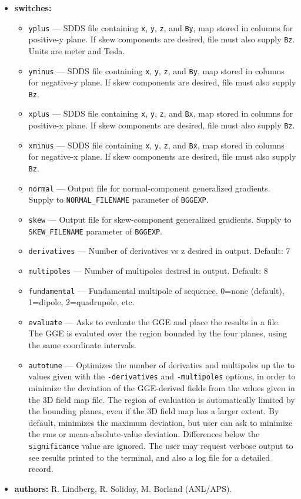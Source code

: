 \documentclass[11pt]{article}
\begin{document}
\begin{itemize}
\item {\bf switches:}
\begin{itemize}
\item {\tt yplus} --- SDDS file containing \verb|x|, \verb|y|, \verb|z|, and \verb|By|, 
  map stored in columns for positive-y plane. If skew components are desired, file must also supply \verb|Bz|.
  Units are meter and Tesla.
\item {\tt yminus} --- SDDS file containing \verb|x|, \verb|y|, \verb|z|, and \verb|By|, 
  map stored in columns for negative-y plane. If skew components are desired, file must also supply \verb|Bz|.
\item {\tt xplus} ---  SDDS file containing \verb|x|, \verb|y|, \verb|z|, and \verb|Bx|, 
  map stored in columns for positive-x plane. If skew components are desired, file must also supply \verb|Bz|.
\item {\tt xminus} ---  SDDS file containing \verb|x|, \verb|y|, \verb|z|, and \verb|Bx|, 
  map stored in columns for negative-x plane. If skew components are desired, file must also supply \verb|Bz|.
\item {\tt normal} ---  Output file for normal-component generalized gradients. Supply to \verb|NORMAL_FILENAME|
  parameter of \verb|BGGEXP|.
\item {\tt skew} ---  Output file for skew-component generalized gradients. Supply to \verb|SKEW_FILENAME|
  parameter of \verb|BGGEXP|.
\item {\tt derivatives} --- Number of derivatives vs z desired in output. Default: 7
\item {\tt multipoles} ---  Number of multipoles desired in output. Default: 8
\item {\tt fundamental} --- Fundamental multipole of sequence. 0=none (default), 1=dipole, 2=quadrupole, etc.
\item {\tt evaluate} --- Asks to evaluate the GGE and place the results in a file. The GGE is evaluted over
  the region bounded by the four planes, using the same coordinate intervals.
\item {\tt autotune} --- Optimizes the number of derivaties and multipoles up the to values given with the
  \verb|-derivatives| and \verb|-multipoles| options, in order to minimize the deviation of the GGE-derived
  fields from the values given in the 3D field map file. The region of evaluation is automatically limited by
  the bounding planes, even if the 3D field map has a larger extent. By default, minimizes the maximum deviation, but user can
  ask to minimize the rms or mean-absolute-value deviation. Differences below the \verb|significance| value are
  ignored. The user may request verbose output to see results printed to the terminal, and also a log file
  for a detailed record.
\end{itemize}

\item {\bf authors:} R. Lindberg, R. Soliday, M. Borland (ANL/APS).
\end{itemize}
\end{document}
